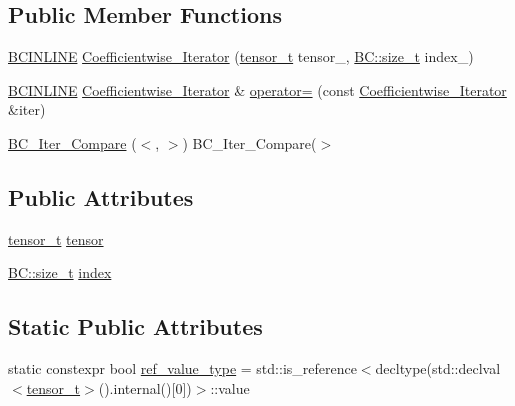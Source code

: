 \subsection*{Public Member Functions}
\begin{DoxyCompactItemize}
\item 
\hyperlink{BlackCat__Common_8h_a6699e8b0449da5c0fafb878e59c1d4b1}{B\+C\+I\+N\+L\+I\+NE} \hyperlink{structBC_1_1tensors_1_1iterators_1_1Coefficientwise__Iterator_aac1c113d90121ccef06925ab7b9974a2}{Coefficientwise\+\_\+\+Iterator} (\hyperlink{structBC_1_1tensors_1_1iterators_1_1Coefficientwise__Iterator_a9274edbb77b7745545324238ef50c648}{tensor\+\_\+t} tensor\+\_\+, \hyperlink{namespaceBC_a6007cbc4eeec401a037b558910a56173}{B\+C\+::size\+\_\+t} index\+\_)
\item 
\hyperlink{BlackCat__Common_8h_a6699e8b0449da5c0fafb878e59c1d4b1}{B\+C\+I\+N\+L\+I\+NE} \hyperlink{structBC_1_1tensors_1_1iterators_1_1Coefficientwise__Iterator}{Coefficientwise\+\_\+\+Iterator} \& \hyperlink{structBC_1_1tensors_1_1iterators_1_1Coefficientwise__Iterator_a05dd46232850ed562e155358bde56c23}{operator=} (const \hyperlink{structBC_1_1tensors_1_1iterators_1_1Coefficientwise__Iterator}{Coefficientwise\+\_\+\+Iterator} \&iter)
\item 
\hyperlink{structBC_1_1tensors_1_1iterators_1_1Coefficientwise__Iterator_aaddf85c066dc56d5516c367374af8ebe}{B\+C\+\_\+\+Iter\+\_\+\+Compare} ($<$, $>$) B\+C\+\_\+\+Iter\+\_\+\+Compare($>$
\end{DoxyCompactItemize}
\subsection*{Public Attributes}
\begin{DoxyCompactItemize}
\item 
\hyperlink{structBC_1_1tensors_1_1iterators_1_1Coefficientwise__Iterator_a9274edbb77b7745545324238ef50c648}{tensor\+\_\+t} \hyperlink{structBC_1_1tensors_1_1iterators_1_1Coefficientwise__Iterator_a73ff638ac0260b4ff4b5f16ac808b7a5}{tensor}
\item 
\hyperlink{namespaceBC_a6007cbc4eeec401a037b558910a56173}{B\+C\+::size\+\_\+t} \hyperlink{structBC_1_1tensors_1_1iterators_1_1Coefficientwise__Iterator_aa8b7cbef11c819b0bff18977500e0f19}{index}
\end{DoxyCompactItemize}
\subsection*{Static Public Attributes}
\begin{DoxyCompactItemize}
\item 
static constexpr bool \hyperlink{structBC_1_1tensors_1_1iterators_1_1Coefficientwise__Iterator_a2403b3f40c2a5266a68a74508061946c}{ref\+\_\+value\+\_\+type} = std\+::is\+\_\+reference$<$decltype(std\+::declval$<$\hyperlink{structBC_1_1tensors_1_1iterators_1_1Coefficientwise__Iterator_a9274edbb77b7745545324238ef50c648}{tensor\+\_\+t}$>$().internal()\mbox{[}0\mbox{]})$>$\+::value
\end{DoxyCompactItemize}



